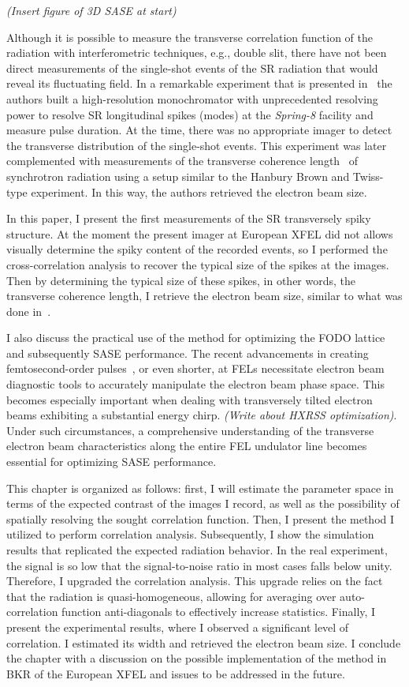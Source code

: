     \textit{(Insert figure of 3D SASE at start)}
    
    Although it is possible to measure the transverse correlation function of the radiation with interferometric techniques, e.g., double slit, there have not been direct measurements of the single-shot events of the SR radiation that would reveal its fluctuating field. In a remarkable experiment that is presented in~\cite{cite} the authors built a high-resolution monochromator with unprecedented resolving power to resolve SR longitudinal spikes (modes) at the \textit{Spring-8} facility and measure pulse duration. At the time, there was no appropriate imager to detect the transverse distribution of the single-shot events. This experiment was later complemented with measurements of the transverse coherence length~\cite{cite} of synchrotron radiation using a setup similar to the Hanbury Brown and Twiss-type experiment. In this way, the authors retrieved the electron beam size.
    
    In this paper, I present the first measurements of the SR transversely spiky structure. 
    At the moment the present imager at European XFEL did not allows visually determine the spiky content of the recorded events, so I performed the cross-correlation analysis to recover the typical size of the spikes at the images. Then by determining the typical size of these spikes, in other words, the transverse coherence length, I retrieve the electron beam size, similar to what was done in~\cite{rr}. 
    
    I also discuss the practical use of the method for optimizing the FODO lattice and subsequently SASE performance. The recent advancements in creating femtosecond-order pulses~\cite{cite}, or even shorter, at FELs necessitate electron beam diagnostic tools to accurately manipulate the electron beam phase space. This becomes especially important when dealing with transversely tilted electron beams exhibiting a substantial energy chirp. \textit{(Write about HXRSS optimization)}. Under such circumstances, a comprehensive understanding of the transverse electron beam characteristics along the entire FEL undulator line becomes essential for optimizing SASE performance.
    
    This chapter is organized as follows: first, I will estimate the parameter space in terms of the expected contrast of the images I record, as well as the possibility of spatially resolving the sought correlation function. Then, I present the method I utilized to perform correlation analysis. Subsequently, I show the simulation results that replicated the expected radiation behavior. In the real experiment, the signal is so low that the signal-to-noise ratio in most cases falls below unity. Therefore, I upgraded the correlation analysis. This upgrade relies on the fact that the radiation is quasi-homogeneous, allowing for averaging over auto-correlation function anti-diagonals to effectively increase statistics. Finally, I present the experimental results, where I observed a significant level of correlation. I estimated its width and retrieved the electron beam size. I conclude the chapter with a discussion on the possible implementation of the method in BKR of the European XFEL and issues to be addressed in the future.
    
